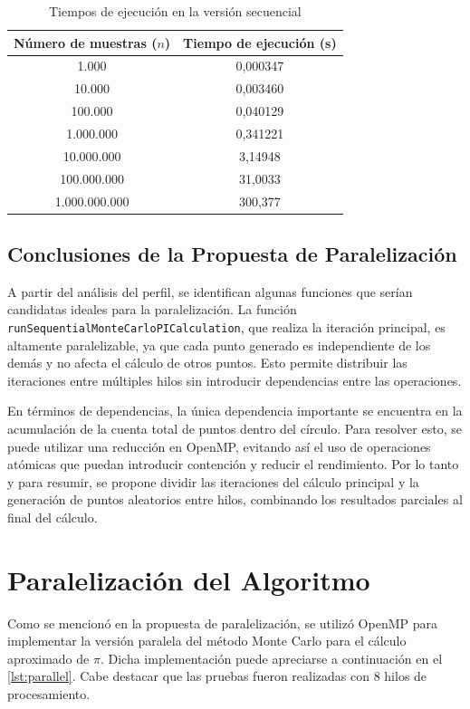 \documentclass[a4paper, 10pt]{IEEEtran}
\begin{document}
\begin{table}[H]
  \centering
  \begin{tabular}{|c|c|}
    \hline
    \textbf{Número de muestras ($n$)} & \textbf{Tiempo de ejecución (s)} \\
    \hline
    1.000         & 0,000347 \\
    10.000        & 0,003460 \\
    100.000       & 0,040129 \\
    1.000.000     & 0,341221 \\
    10.000.000    & 3,14948 \\
    100.000.000   & 31,0033 \\
    1.000.000.000 & 300,377 \\
    \hline
  \end{tabular}
  \caption{Tiempos de ejecución en la versión secuencial}
  \label{tab:sequential_execution_times}
\end{table}

\subsection{Conclusiones de la Propuesta de Paralelización}
A partir del análisis del perfil, se identifican algunas funciones que serían candidatas ideales para la paralelización. La función \texttt{runSequentialMonteCarloPICalculation}, que realiza la iteración principal, es altamente paralelizable, ya que cada punto generado es independiente de los demás y no afecta el cálculo de otros puntos. Esto permite distribuir las iteraciones entre múltiples hilos sin introducir dependencias entre las operaciones.

En términos de dependencias, la única dependencia importante se encuentra en la acumulación de la cuenta total de puntos dentro del círculo. Para resolver esto, se puede utilizar una reducción en OpenMP, evitando así el uso de operaciones atómicas que puedan introducir contención y reducir el rendimiento. Por lo tanto y para resumir, se propone dividir las iteraciones del cálculo principal y la generación de puntos aleatorios entre hilos, combinando los resultados parciales al final del cálculo.

\section{Paralelización del Algoritmo}
Como se mencionó en la propuesta de paralelización, se utilizó OpenMP para implementar la versión paralela del método Monte Carlo para el cálculo aproximado de $\pi$. Dicha implementación puede apreciarse a continuación en el \cref{lst:parallel}. Cabe destacar que las pruebas fueron realizadas con 8 hilos de procesamiento.
\end{document}
